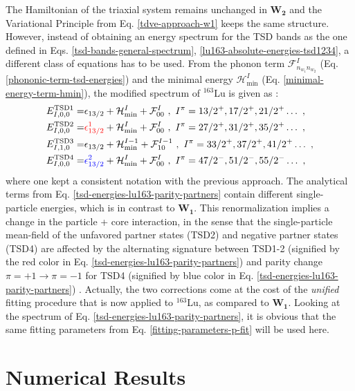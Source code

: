 The Hamiltonian of the triaxial system remains unchanged in $\mathbf{W_2}$ and the Variational Principle from Eq. \ref{tdve-approach-w1} keeps the same structure. However, instead of obtaining an energy spectrum  for the TSD bands as the one defined in Eqs. \ref{tsd-bands-general-spectrum}, \ref{lu163-absolute-energies-tsd1234}, a different class of equations has to be used. From the phonon term $\mathcal{F}_{n_{w_1}n_{w_2}}^I$ (Eq. \ref{phononic-term-tsd-energies}) and the minimal energy $\mathcal{H}_\text{min}^I$ (Eq. \ref{minimal-energy-term-hmin}), the modified spectrum of $^{163}$Lu is given as \cite{poenaru2021parity}:
\begin{align}
    E_{I,0,0}^\text{TSD1}=&\epsilon_{13/2}+\mathcal{H}_\text{min}^I+\mathcal{F}_{00}^I\nonumber\ ,\ I^\pi=13/2^+,17/2^+,21/2^+\dots\ ,\\
    E_{I,0,0}^\text{TSD2}=&{\color{red}\epsilon_{13/2}^1}+\mathcal{H}_\text{min}^I+\mathcal{F}_{00}^I\nonumber\ ,\ I^\pi=27/2^+,31/2^+,35/2^+\dots\ ,\\
    E_{I,1,0}^\text{TSD3}=&\epsilon_{13/2}+\mathcal{H}_\text{min}^{I-1}+\mathcal{F}_{10}^{I-1}\nonumber\ ,\ I^\pi=33/2^+,37/2^+,41/2^+\dots\ ,\\
    E_{I,0,0}^\text{TSD4}=&{\color{blue}\epsilon_{13/2}^2}+\mathcal{H}_\text{min}^I+\mathcal{F}_{00}^I\ ,\ I^\pi=47/2^-,51/2^-,55/2^-\dots\ ,
    \label{tsd-energies-lu163-parity-partners}
\end{align}
where one kept a consistent notation with the previous approach. The analytical terms from Eq. \ref{tsd-energies-lu163-parity-partners} contain different single-particle energies, which is in contrast to $\mathbf{W_1}$. This renormalization implies a change in the particle + core interaction, in the sense that the single-particle mean-field of the unfavored partner states (TSD2) and negative partner states (TSD4) are affected by the alternating signature between TSD1-2 (signified by the red color in Eq. \ref{tsd-energies-lu163-parity-partners}) and parity change $\pi=+1\to \pi=-1$ for TSD4 (signified by blue color in Eq. \ref{tsd-energies-lu163-parity-partners}) \cite{poenaru2021parity,poenaru2021extensive1,poenaru2021extensive2}. Actually, the two corrections come at the cost of the \emph{unified} fitting procedure that is now applied to $^{163}$Lu, as compared to $\mathbf{W_1}$. Looking at the spectrum of Eq. \ref{tsd-energies-lu163-parity-partners}, it is obvious that the same fitting parameters from Eq. \ref{fitting-parameters-p-fit} will be used here.

\section{Numerical Results}
\label{aw2-numerical-results}

